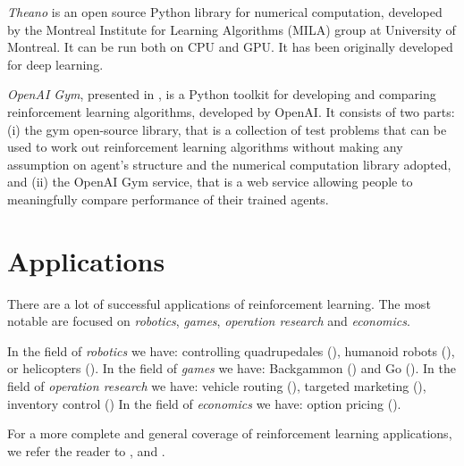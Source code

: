 \textit{Theano} is an open source Python library for numerical computation, developed by the Montreal Institute for Learning Algorithms (MILA) group at University of Montreal.
%
It can be run both on CPU and GPU.
%
It has been originally developed for deep learning.

\textit{OpenAI Gym}, presented in \cite{openaigym}, is a Python toolkit for developing and comparing reinforcement learning algorithms, developed by OpenAI.
%
It consists of two parts: 
(i) the gym open-source library, that is a collection of test problems that can be used to work out reinforcement learning algorithms without making any assumption on agent's structure and the numerical computation library adopted, and
(ii) the OpenAI Gym service, that is a web service allowing people to meaningfully compare performance of their trained agents.


\section{Applications}
\label{sec:reinforcement-learning-applications}
There are a lot of successful applications of reinforcement learning. 
The most notable are focused on \textit{robotics}, \textit{games}, \textit{operation research} and \textit{economics}.

In the field of \textit{robotics} we have: controlling quadrupedales (\cite{kohl2004policy}), humanoid robots (\cite{peters2003reinforcement}), or helicopters (\cite{abbeel2007application}).
%
In the field of \textit{games} we have: Backgammon (\cite{tesauro1995temporal}) and Go (\cite{gelly2007combininge}).
%
In the field of \textit{operation research} we have: vehicle routing (\cite{proper2006scaling}), targeted marketing (\cite{abe2004cross}), inventory control
(\cite{chang2007recursive})
%
In the field of \textit{economics} we have: option pricing (\cite{tsitsiklis2001regression}).

For a more complete and general coverage of reinforcement learning applications, we refer the reader to \cite{rlApplicationsUalberta}, \cite{rlApplicationsPbworks} and \cite{rlApplicationsAikorea}.

